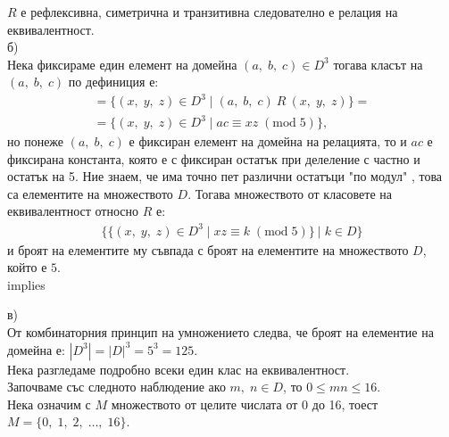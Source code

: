 \documentclass[a4paper, 12pt, oneside]{article}
\begin{document}
$R$ е рефлексивна, симетрична и транзитивна следователно е релация на еквивалентност. \\

б) \\

Нека фиксираме един елемент на домейна $(a, \; b, \; c) \in D^3$ тогава класът на $(a, \; b, \; c)$ по дефиниция е:
\begin{align*}
    [(a, \; b, \; c)] = \{(x, \; y, \; z) \in D^3 \; | \; (a, \; b, \; c) \: R \: (x, \; y, \; z)\} = \\
    = \{(x, \; y, \; z) \in D^3 \; | \; ac \equiv xz \; (\mathrm{mod} \; 5) \},
\end{align*}
но понеже $(a, \; b, \; c)$ е фиксиран елемент на домейна на релацията, то и $ac$ е фиксирана константа,
която е с фиксиран остатък при делеление с частно и остатък на 5.
Ние знаем, че има точно пет различни остатъци "по модул" , това са елементите на множеството $D$.
Тогава множеството от класовете на еквивалентност относно $R$ е:
\begin{align*}
    \{\{(x, \; y, \; z) \in D^3 \; | \; xz \equiv k \; (\mathrm{mod} \; 5)\} \: | \; k \in D \}
\end{align*}
и броят на елементите му съвпада с броят на елементите на множеството $D$, който е $5$. \\implies

в) \\

От комбинаторния принцип на умножението следва, че броят на елементие на домейна е: $|D^3| = |D|^3 = 5^3 = 125$. \\

Нека разгледаме подробно всеки един клас на еквивалентност. \\

Започваме със следното наблюдение ако $m, \; n \in D$, то $0 \leq mn \leq 16$.\\

Нека означим с $M$ множеството от целите числата от 0 до 16, тоест $M = \{0, \; 1, \; 2, \; \dots, \; 16\}$. \\
\end{document}
